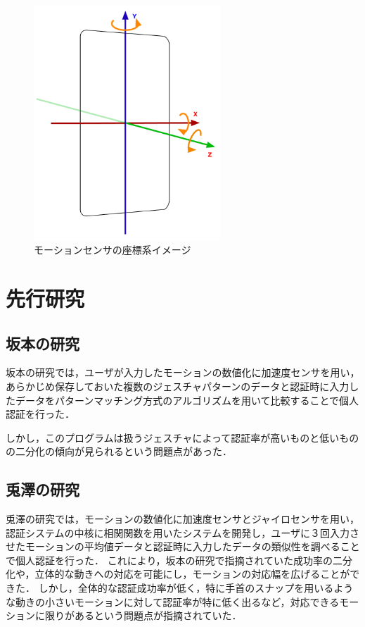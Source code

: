 \documentclass[11pt]{jreport}
\begin{document}
    \begin{figure}[htbp]
      \begin{center}
        \includegraphics[width=7cm, bb=0 0 373 469]{SmartphoneSensor.pdf}
        \caption{モーションセンサの座標系イメージ}
        \label{sensor}
      \end{center}
    \end{figure}

\chapter{先行研究}
	\section{坂本の研究}
	坂本の研究\cite{sakamoto}では，ユーザが入力したモーションの数値化に加速度センサを用い，あらかじめ保存しておいた複数のジェスチャパターンのデータと認証時に入力したデータをパターンマッチング方式のアルゴリズムを用いて比較することで個人認証を行った．

    しかし，このプログラムは扱うジェスチャによって認証率が高いものと低いものの二分化の傾向が見られるという問題点があった．

	\section{兎澤の研究}
    兎澤の研究\cite{tozawa}では，モーションの数値化に加速度センサとジャイロセンサを用い，認証システムの中核に相関関数を用いたシステムを開発し，ユーザに３回入力させたモーションの平均値データと認証時に入力したデータの類似性を調べることで個人認証を行った．
    これにより，坂本の研究で指摘されていた成功率の二分化や，立体的な動きへの対応を可能にし，モーションの対応幅を広げることができた．
    しかし，全体的な認証成功率が低く，特に手首のスナップを用いるような動きの小さいモーションに対して認証率が特に低く出るなど，対応できるモーションに限りがあるという問題点が指摘されていた．
\end{document}
